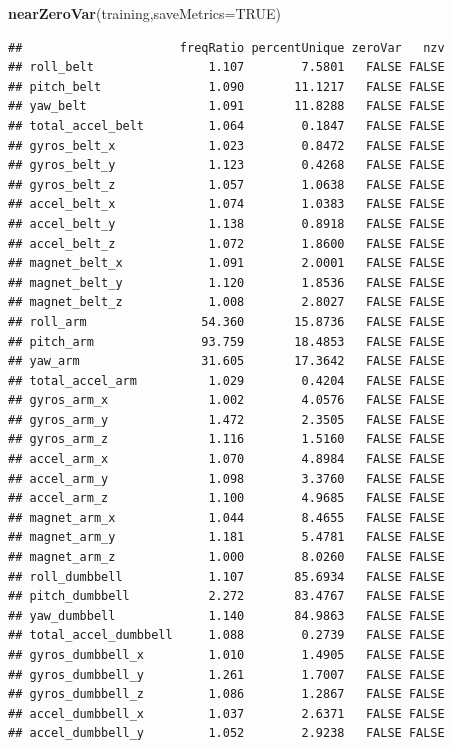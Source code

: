 \documentclass[]{article}
\newenvironment{Shaded}{\begin{snugshade}}{\end{snugshade}}
\newcommand{\KeywordTok}[1]{\textcolor[rgb]{0.13,0.29,0.53}{\textbf{{#1}}}}
\newcommand{\DataTypeTok}[1]{\textcolor[rgb]{0.13,0.29,0.53}{{#1}}}
\newcommand{\OtherTok}[1]{\textcolor[rgb]{0.56,0.35,0.01}{{#1}}}
\newcommand{\NormalTok}[1]{{#1}}
\begin{document}
\begin{Shaded}
\begin{Highlighting}[]
\KeywordTok{nearZeroVar}\NormalTok{(training,}\DataTypeTok{saveMetrics=}\OtherTok{TRUE}\NormalTok{)}
\end{Highlighting}
\end{Shaded}

\begin{verbatim}
##                      freqRatio percentUnique zeroVar   nzv
## roll_belt                1.107        7.5801   FALSE FALSE
## pitch_belt               1.090       11.1217   FALSE FALSE
## yaw_belt                 1.091       11.8288   FALSE FALSE
## total_accel_belt         1.064        0.1847   FALSE FALSE
## gyros_belt_x             1.023        0.8472   FALSE FALSE
## gyros_belt_y             1.123        0.4268   FALSE FALSE
## gyros_belt_z             1.057        1.0638   FALSE FALSE
## accel_belt_x             1.074        1.0383   FALSE FALSE
## accel_belt_y             1.138        0.8918   FALSE FALSE
## accel_belt_z             1.072        1.8600   FALSE FALSE
## magnet_belt_x            1.091        2.0001   FALSE FALSE
## magnet_belt_y            1.120        1.8536   FALSE FALSE
## magnet_belt_z            1.008        2.8027   FALSE FALSE
## roll_arm                54.360       15.8736   FALSE FALSE
## pitch_arm               93.759       18.4853   FALSE FALSE
## yaw_arm                 31.605       17.3642   FALSE FALSE
## total_accel_arm          1.029        0.4204   FALSE FALSE
## gyros_arm_x              1.002        4.0576   FALSE FALSE
## gyros_arm_y              1.472        2.3505   FALSE FALSE
## gyros_arm_z              1.116        1.5160   FALSE FALSE
## accel_arm_x              1.070        4.8984   FALSE FALSE
## accel_arm_y              1.098        3.3760   FALSE FALSE
## accel_arm_z              1.100        4.9685   FALSE FALSE
## magnet_arm_x             1.044        8.4655   FALSE FALSE
## magnet_arm_y             1.181        5.4781   FALSE FALSE
## magnet_arm_z             1.000        8.0260   FALSE FALSE
## roll_dumbbell            1.107       85.6934   FALSE FALSE
## pitch_dumbbell           2.272       83.4767   FALSE FALSE
## yaw_dumbbell             1.140       84.9863   FALSE FALSE
## total_accel_dumbbell     1.088        0.2739   FALSE FALSE
## gyros_dumbbell_x         1.010        1.4905   FALSE FALSE
## gyros_dumbbell_y         1.261        1.7007   FALSE FALSE
## gyros_dumbbell_z         1.086        1.2867   FALSE FALSE
## accel_dumbbell_x         1.037        2.6371   FALSE FALSE
## accel_dumbbell_y         1.052        2.9238   FALSE FALSE

\end{verbatim}
\end{document}
